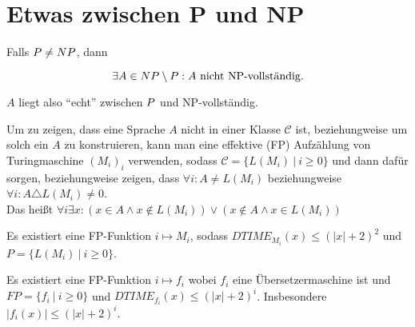 

\section{Etwas zwischen P und NP}



\begin{satz}
    

    Falls $P \neq NP$, dann

    $$ \exists A \in NP \setminus P: A \text{ nicht NP-vollständig.} $$

    $A$ liegt also ``echt'' zwischen $P$ und NP-vollständig.

    
\end{satz}



\begin{definition}

    
    Um zu zeigen, dass eine Sprache $A$ nicht in einer Klasse $\mathcal{C}$ ist, beziehungweise um solch ein $A$ zu konstruieren, kann man eine effektive (FP) Aufzählung von Turingmaschine $(M_i)_i$ verwenden, sodass $\mathcal{C} = \{ L(M_i)\ |\ i \geq 0 \}$  und dann dafür sorgen, beziehungweise zeigen, dass $\forall i: A \neq L(M_i)$ beziehungweise $\forall i: A \triangle L(M_i) \neq 0$.\\
    Das heißt $\forall i \exists x: \left(x \in A \land x \notin L(M_i) \right) \lor \left( x \notin A \land x \in L(M_i) \right)$

\end{definition}


\begin{lemma}
    
    Es existiert eine FP-Funktion $i \mapsto M_i$, sodass $DTIME_{M_i}(x) \leq (|x| + 2)^2$ und $P = \{ L(M_i)\ |\ i \geq 0 \}$.

\end{lemma}

\begin{lemma}
    
    Es existiert eine FP-Funktion $i \mapsto f_i$ wobei $f_i$ eine Übersetzermaschine ist und $FP = \{ f_i\ |\ i \geq 0 \}$ und $DTIME_{f_i}(x) \leq (|x| + 2)^i$. Insbesondere $|f_i(x)| \leq (|x| + 2)^i$.

\end{lemma}

